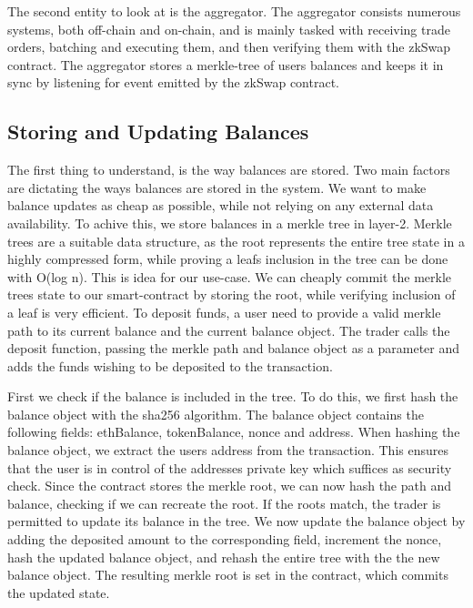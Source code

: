 \documentclass[11pt,twoside,a4paper,final]{book}
\begin{document}
The second entity to look at is the aggregator. The aggregator consists numerous systems, both off-chain and on-chain, and is mainly tasked with receiving trade orders, batching and executing them, and then verifying them with the zkSwap contract. The aggregator stores a merkle-tree of users balances and keeps it in sync by listening for event emitted by the zkSwap contract. 


\subsection{Storing and Updating Balances}
The first thing to understand, is the way balances are stored. Two main factors are dictating the ways balances are stored in the system. We want to make balance updates as cheap as possible, while not relying on any external data availability. To achive this, we store balances in a merkle tree in layer-2. Merkle trees are a suitable data structure, as the root represents the entire tree state in a highly compressed form, while proving a leafs inclusion in the tree can be done with O(log n). This is idea for our use-case. We can cheaply commit the merkle trees state to our smart-contract by storing the root, while verifying inclusion of a leaf is very efficient. 
To deposit funds, a user need to provide a valid merkle path to its current balance and the current balance object. The trader calls the deposit function, passing the merkle path and balance object as a parameter and adds the funds wishing to be deposited to the transaction. 

First we check if the balance is included in the tree. To do this, we first hash the balance object with the sha256 algorithm. The balance object contains the following fields: ethBalance, tokenBalance, nonce and address. When hashing the balance object, we extract the users address from the transaction. This ensures that the user is in control of the addresses private key which suffices as security check. Since the contract stores the merkle root, we can now hash the path and balance, checking if we can recreate the root. If the roots match, the trader is permitted to update its balance in the tree. We now update the balance object by adding the deposited amount to the corresponding field, increment the nonce, hash the updated balance object, and rehash the entire tree with the the new balance object. The resulting merkle root is set in the contract, which commits the updated state. 
\end{document}
